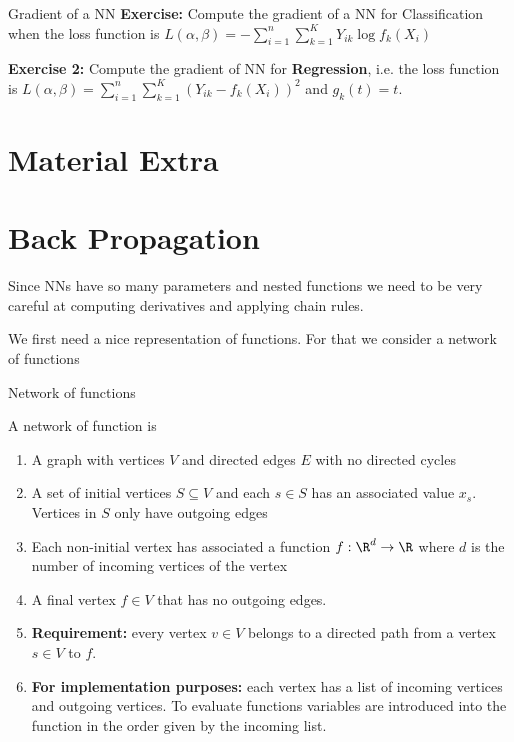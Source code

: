 \documentclass[9pt,xcolor=table]{beamer}
\begin{document}
\begin{frame}{Gradient of a NN}
\textbf{Exercise:} Compute the gradient of a NN for Classification when the loss function is $L(\alpha,\beta) = -\sum_{i=1}^n \sum_{k=1}^K Y_{ik} \log f_k(X_i)$\\

\vspace{1cm}

\textbf{Exercise 2:} Compute the gradient of NN for \textbf{Regression}, i.e. the loss function is $L(\alpha,\beta) = \sum_{i=1}^n \sum_{k=1}^K (Y_{ik}-f_k(X_i))^2$ and $g_k(t) = t$.
\end{frame}

\section{Material Extra}

\section{Back Propagation}
\begin{frame}
	Since NNs have so many parameters and nested functions we need to be very careful at computing derivatives and applying chain rules.
	\\
	
	\vspace{1cm}
	
	We first need a nice representation of functions. For that we consider a network of functions
	
\end{frame}

\begin{frame}{Network of functions}
	
	A network of function is 
	
	\begin{enumerate}
		\item A graph with vertices $V$ and directed edges $E$ with no directed cycles
		\item A set of initial vertices $S\subseteq V$ and each $s \in S$ has an associated value $x_s$. Vertices in $S$ only have outgoing edges
		\item Each non-initial vertex has associated a function $f:\R^d \to \R$ where $d$ is the number  of incoming vertices of the vertex
		\item A final vertex $f \in V$ that has no outgoing edges.
		\item \textbf{Requirement:} every vertex $v \in V$ belongs to a directed path from a vertex $s \in V$ to $f$.
		\item \textbf{For implementation purposes:} each vertex has a list of incoming vertices and outgoing vertices. To evaluate functions variables are introduced into the function in the order given by the incoming list.
	\end{enumerate}
	
\end{frame}
\end{document}
